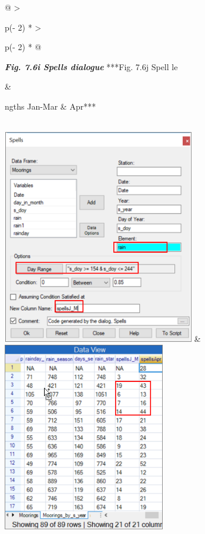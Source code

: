 \documentclass[
  letterpaper,
  DIV=11,
  numbers=noendperiod]{scrreprt}
\begin{document}
\begin{longtable}[]{@{}
  >{\raggedright\arraybackslash}p{(\columnwidth - 2\tabcolsep) * }
  >{\raggedright\arraybackslash}p{(\columnwidth - 2\tabcolsep) * }@{}}
\toprule\noalign{}
\begin{minipage}[b]{\linewidth}\raggedright
\textbf{\emph{Fig. 7.6i Spells dialogue}} ***Fig. 7.6j Spell le
\end{minipage} & \begin{minipage}[b]{\linewidth}\raggedright
ngths Jan-Mar \& Apr***
\end{minipage} \\
\midrule\noalign{}
\endhead
\bottomrule\noalign{}
\endlastfoot
\includegraphics[width=3.3136in,height=3.70842in]{figures/Fig7.6i.png} &
\includegraphics[width=2.80591in,height=3.26927in]{figures/Fig7.6j.png} \\
\end{longtable}
\end{document}
